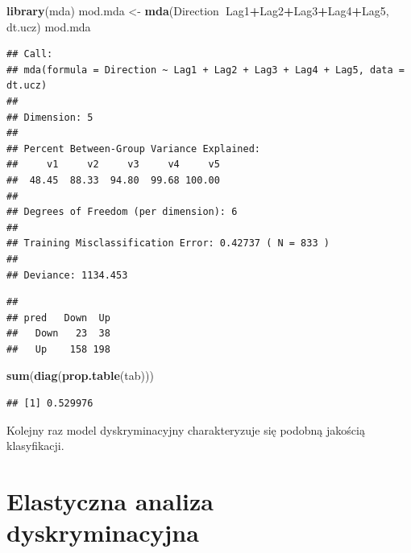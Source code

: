\documentclass[]{book}
\newenvironment{Shaded}{\begin{snugshade}}{\end{snugshade}}
\newcommand{\DataTypeTok}[1]{\textcolor[rgb]{0.13,0.29,0.53}{#1}}
\newcommand{\KeywordTok}[1]{\textcolor[rgb]{0.13,0.29,0.53}{\textbf{#1}}}
\newcommand{\NormalTok}[1]{#1}
\newcommand{\OperatorTok}[1]{\textcolor[rgb]{0.81,0.36,0.00}{\textbf{#1}}}
\newcommand{\StringTok}[1]{\textcolor[rgb]{0.31,0.60,0.02}{#1}}
\theoremstyle{plain}
\theoremstyle{definition}
\theoremstyle{definition}
\theoremstyle{definition}
\theoremstyle{definition}
\theoremstyle{remark}
\begin{document}
\begin{Shaded}
\begin{Highlighting}[]
\KeywordTok{library}\NormalTok{(mda)}
\NormalTok{mod.mda <-}\StringTok{ }\KeywordTok{mda}\NormalTok{(Direction}\OperatorTok{~}\NormalTok{Lag1}\OperatorTok{+}\NormalTok{Lag2}\OperatorTok{+}\NormalTok{Lag3}\OperatorTok{+}\NormalTok{Lag4}\OperatorTok{+}\NormalTok{Lag5, dt.ucz)}
\NormalTok{mod.mda}
\end{Highlighting}
\end{Shaded}

\begin{verbatim}
## Call:
## mda(formula = Direction ~ Lag1 + Lag2 + Lag3 + Lag4 + Lag5, data = dt.ucz)
## 
## Dimension: 5 
## 
## Percent Between-Group Variance Explained:
##     v1     v2     v3     v4     v5 
##  48.45  88.33  94.80  99.68 100.00 
## 
## Degrees of Freedom (per dimension): 6 
## 
## Training Misclassification Error: 0.42737 ( N = 833 )
## 
## Deviance: 1134.453
\end{verbatim}

\begin{Shaded}
\end{Shaded}

\begin{verbatim}
##       
## pred   Down  Up
##   Down   23  38
##   Up    158 198
\end{verbatim}

\begin{Shaded}
\begin{Highlighting}[]
\KeywordTok{sum}\NormalTok{(}\KeywordTok{diag}\NormalTok{(}\KeywordTok{prop.table}\NormalTok{(tab)))}
\end{Highlighting}
\end{Shaded}

\begin{verbatim}
## [1] 0.529976
\end{verbatim}

Kolejny raz model dyskryminacyjny charakteryzuje się podobną jakością klasyfikacji.

\hypertarget{elastyczna-analiza-dyskryminacyjna}{%
\section{Elastyczna analiza dyskryminacyjna}\label{elastyczna-analiza-dyskryminacyjna}}
\end{document}
